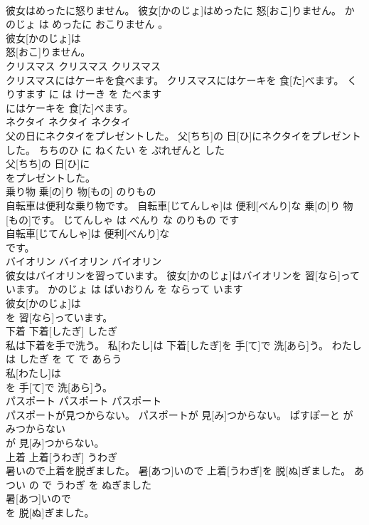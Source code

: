 \documentclass[8pt]{extreport}
\begin{document}
\begin{CJK}{UTF8}{min}
\\	彼女はめったに怒りません。	彼女[かのじょ]はめったに 怒[おこ]りません。	かのじょ は めったに おこりません 。	
\\	彼女[かのじょ]は
\\	怒[おこ]りません。			
\\	クリスマス	クリスマス	クリスマス	
\\	クリスマスにはケーキを食べます。	クリスマスにはケーキを 食[た]べます。	くりすます に は けーき を たべます	
\\	にはケーキを 食[た]べます。			
\\	ネクタイ	ネクタイ	ネクタイ	
\\	父の日にネクタイをプレゼントした。	父[ちち]の 日[ひ]にネクタイをプレゼントした。	ちちのひ に ねくたい を ぷれぜんと した	
\\	父[ちち]の 日[ひ]に
\\	をプレゼントした。			
\\	乗り物	乗[の]り 物[もの]	のりもの	
\\	自転車は便利な乗り物です。	自転車[じてんしゃ]は 便利[べんり]な 乗[の]り 物[もの]です。	じてんしゃ は べんり な のりもの です	
\\	自転車[じてんしゃ]は 便利[べんり]な
\\	です。			
\\	バイオリン	バイオリン	バイオリン	
\\	彼女はバイオリンを習っています。	彼女[かのじょ]はバイオリンを 習[なら]っています。	かのじょ は ばいおりん を ならって います	
\\	彼女[かのじょ]は
\\	を 習[なら]っています。			
\\	下着	下着[したぎ]	したぎ	
\\	私は下着を手で洗う。	私[わたし]は 下着[したぎ]を 手[て]で 洗[あら]う。	わたし は したぎ を て で あらう	
\\	私[わたし]は
\\	を 手[て]で 洗[あら]う。			
\\	パスポート	パスポート	パスポート	
\\	パスポートが見つからない。	パスポートが 見[み]つからない。	ぱすぽーと が みつからない	
\\	が 見[み]つからない。			
\\	上着	上着[うわぎ]	うわぎ	
\\	暑いので上着を脱ぎました。	暑[あつ]いので 上着[うわぎ]を 脱[ぬ]ぎました。	あつい の で うわぎ を ぬぎました	
\\	暑[あつ]いので
\\	を 脱[ぬ]ぎました。			

\end{CJK}
\end{document}
